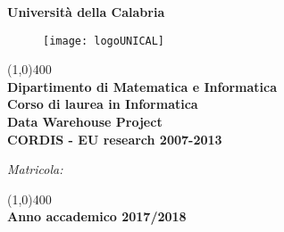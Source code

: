 \begin{center}
	\huge{\textbf{Università della Calabria}}
	\begin{figure}[tb]
		\centering
		\texttt{[image: logoUNICAL]}
	\end{figure}
\end{center}
\begin{center}
	\line(1,0){400}\\[5mm]
	\Large{\textbf{Dipartimento di Matematica e Informatica}}
	\\\Large{\textbf{Corso di laurea in Informatica}}
	\\\vfill
	\Huge{\textbf{Data Warehouse Project \\\noindent CORDIS - EU research 2007-2013}}
	\vfill
\end{center}
\vfill
	\noindent \hfill  \Large{} \par
	\noindent \hfill	\Large{\textit{Matricola:}}
	\begin{center}
	\line(1,0){400}\\[5mm]
	{\large{\bf Anno accademico 2017/2018}}\\
\end{center}
